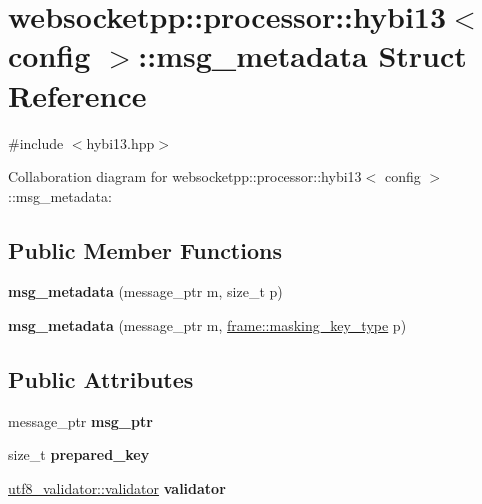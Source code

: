 \hypertarget{structwebsocketpp_1_1processor_1_1hybi13_1_1msg__metadata}{}\section{websocketpp\+:\+:processor\+:\+:hybi13$<$ config $>$\+:\+:msg\+\_\+metadata Struct Reference}
\label{structwebsocketpp_1_1processor_1_1hybi13_1_1msg__metadata}


{\ttfamily \#include $<$hybi13.\+hpp$>$}



Collaboration diagram for websocketpp\+:\+:processor\+:\+:hybi13$<$ config $>$\+:\+:msg\+\_\+metadata\+:
\subsection*{Public Member Functions}
\begin{DoxyCompactItemize}
\item 
\mbox{\label{structwebsocketpp_1_1processor_1_1hybi13_1_1msg__metadata_a386f3ee3c7e1779a8da19385cf14a418}} 
{\bfseries msg\+\_\+metadata} (message\+\_\+ptr m, size\+\_\+t p)
\item 
\mbox{\label{structwebsocketpp_1_1processor_1_1hybi13_1_1msg__metadata_ad5e5baeb6fe05bea4f6569c3635558f8}} 
{\bfseries msg\+\_\+metadata} (message\+\_\+ptr m, \mbox{\hyperlink{unionwebsocketpp_1_1frame_1_1uint32__converter}{frame\+::masking\+\_\+key\+\_\+type}} p)
\end{DoxyCompactItemize}
\subsection*{Public Attributes}
\begin{DoxyCompactItemize}
\item 
\mbox{\label{structwebsocketpp_1_1processor_1_1hybi13_1_1msg__metadata_a49e276abf3be14de45a9111cb13e3d81}} 
message\+\_\+ptr {\bfseries msg\+\_\+ptr}
\item 
\mbox{\label{structwebsocketpp_1_1processor_1_1hybi13_1_1msg__metadata_a4c0cf4af697b0a12396ca5570a888ec1}} 
size\+\_\+t {\bfseries prepared\+\_\+key}
\item 
\mbox{\label{structwebsocketpp_1_1processor_1_1hybi13_1_1msg__metadata_a283c8d119c2c9f2543a2247b465c9416}} 
\mbox{\hyperlink{classwebsocketpp_1_1utf8__validator_1_1validator}{utf8\+\_\+validator\+::validator}} {\bfseries validator}
\end{DoxyCompactItemize}


